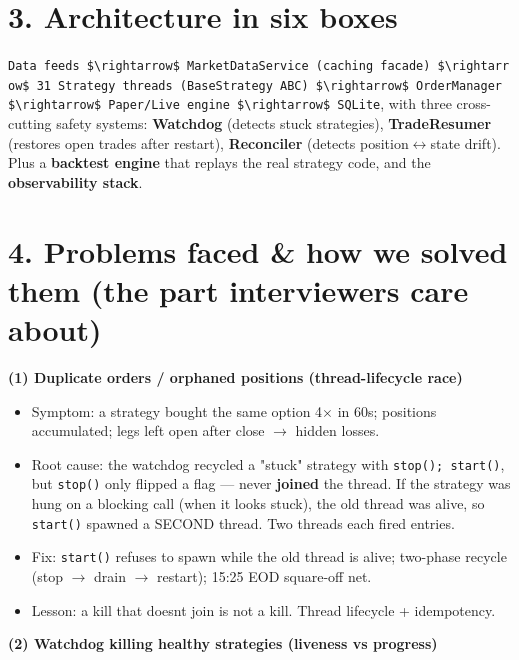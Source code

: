 \documentclass[11pt]{article}
\providecommand{\tightlist}{\setlength{\itemsep}{1pt}\setlength{\parskip}{0pt}}
\begin{document}
\section{3. Architecture in six boxes}\label{3-architecture-in-six-boxes}

\texttt{Data\ feeds\ \$\textbackslash{}rightarrow\$\ MarketDataService\ (caching\ facade)\ \$\textbackslash{}rightarrow\$\ 31\ Strategy\ threads\ (BaseStrategy\ ABC)\ \$\textbackslash{}rightarrow\$\ OrderManager\ \$\textbackslash{}rightarrow\$\ Paper/Live\ engine\ \$\textbackslash{}rightarrow\$\ SQLite}, with three cross-cutting safety systems:
\textbf{Watchdog} (detects stuck strategies), \textbf{TradeResumer} (restores open trades after
restart), \textbf{Reconciler} (detects position\(\leftrightarrow\)state drift). Plus a \textbf{backtest engine} that
replays the real strategy code, and the \textbf{observability stack}.

\section{4. Problems faced \& how we solved them (the part interviewers care about)}\label{4-problems-faced--how-we-solved-them-the-part-interviewers-care-about}

\textbf{(1) Duplicate orders / orphaned positions (thread-lifecycle race)}

\begin{itemize}
\tightlist
\item
  Symptom: a strategy bought the same option 4\(\times\) in 60s; positions accumulated; legs left open after close \(\rightarrow\) hidden losses.
\item
  Root cause: the watchdog recycled a "stuck" strategy with \texttt{stop();\ start()}, but \texttt{stop()} only flipped a flag --- never \textbf{joined} the thread. If the strategy was hung on a blocking call (when it looks stuck), the old thread was alive, so \texttt{start()} spawned a SECOND thread. Two threads each fired entries.
\item
  Fix: \texttt{start()} refuses to spawn while the old thread is alive; two-phase recycle (stop \(\rightarrow\) drain \(\rightarrow\) restart); 15:25 EOD square-off net.
\item
  Lesson: a kill that doesn\textquotesingle t join is not a kill. Thread lifecycle + idempotency.
\end{itemize}

\textbf{(2) Watchdog killing healthy strategies (liveness vs progress)}
\end{document}

